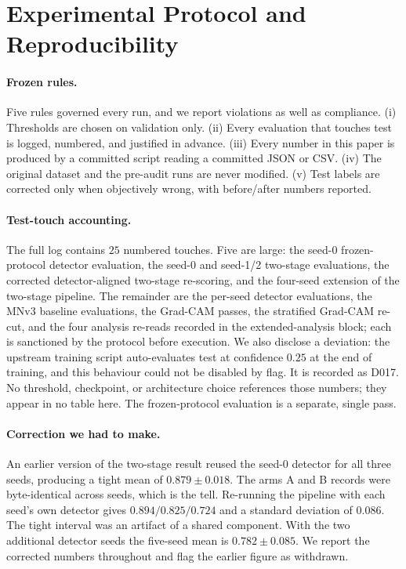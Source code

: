 \section{Experimental Protocol and Reproducibility}
\label{sec:protocol}

\paragraph{Frozen rules.} Five rules governed every run, and we report violations
as well as compliance. (i) Thresholds are chosen on validation only. (ii) Every
evaluation that touches test is logged, numbered, and justified in advance.
(iii) Every number in this paper is produced by a committed script reading a
committed JSON or CSV. (iv) The original dataset and the pre-audit runs are never
modified. (v) Test labels are corrected only when objectively wrong, with
before/after numbers reported.

\paragraph{Test-touch accounting.} The full log contains $25$ numbered touches.
Five are large: the seed-0 frozen-protocol detector evaluation, the seed-0 and
seed-1/2 two-stage evaluations, the corrected detector-aligned two-stage
re-scoring, and the four-seed extension of the two-stage pipeline. The remainder
are the per-seed detector evaluations, the MNv3 baseline evaluations, the
Grad-CAM passes, the stratified Grad-CAM re-cut, and the four analysis re-reads
recorded in the extended-analysis block; each is sanctioned by the protocol
before execution. We also disclose a deviation: the upstream training script
auto-evaluates test at confidence $0.25$ at the end of training, and this
behaviour could not be disabled by flag. It is recorded as D017. No threshold,
checkpoint, or architecture choice references those numbers; they appear in no
table here. The frozen-protocol evaluation is a separate, single pass.

\paragraph{Correction we had to make.} An earlier version of the two-stage result
reused the seed-0 detector for all three seeds, producing a tight mean of
$0.879 \pm 0.018$. The arms A and B records were byte-identical across seeds,
which is the tell. Re-running the pipeline with each seed's own detector gives
$0.894 / 0.825 / 0.724$ and a standard deviation of $0.086$. The tight interval
was an artifact of a shared component. With the two additional detector seeds the
five-seed mean is $0.782 \pm 0.085$. We report the corrected numbers throughout
and flag the earlier figure as withdrawn.


